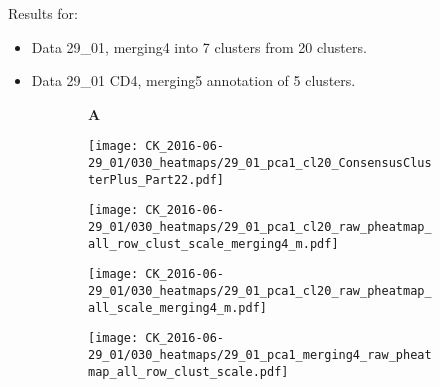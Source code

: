 \documentclass[a4paper, 12pt]{article}
\begin{document}
\pagestyle{empty}

Results for:
\begin{itemize}
  \item Data 29\_01, merging4 into 7 clusters from 20 clusters. 
  \item Data 29\_01 CD4, merging5 annotation of 5 clusters.
\end{itemize}

\begin{figure}[!thb]
\centering

    \caption{Data 29\_01, merging4 - 7 clusters}
    \begin{subfigure}[t]{0.02\textwidth}
    \vskip 0pt
        \textbf{\textsf{\normalsize A}}
    \end{subfigure}
    \begin{subfigure}[t]{0.45\textwidth}
    \vskip 0pt
    \caption{}
        \texttt{[image: CK\_2016-06-29\_01/030\_heatmaps/29\_01\_pca1\_cl20\_ConsensusClusterPlus\_Part22.pdf]}
    \end{subfigure}
    
\end{figure}


\begin{figure}[!thb]
\centering

    \caption{}
    \begin{subfigure}[t]{0.02\textwidth}
    \vskip 0pt
        \textbf{\textsf{\normalsize }}
    \end{subfigure}
    \begin{subfigure}[t]{0.9\textwidth}
    \vskip 0pt
    \caption{}
        \texttt{[image: CK\_2016-06-29\_01/030\_heatmaps/29\_01\_pca1\_cl20\_raw\_pheatmap\_all\_row\_clust\_scale\_merging4\_m.pdf]}
    \end{subfigure}
    
    \caption{}
    \begin{subfigure}[t]{0.02\textwidth}
    \vskip 0pt
        \textbf{\textsf{\normalsize }}
    \end{subfigure}
    \begin{subfigure}[t]{0.9\textwidth}
    \vskip 0pt
    \caption{}
        \texttt{[image: CK\_2016-06-29\_01/030\_heatmaps/29\_01\_pca1\_cl20\_raw\_pheatmap\_all\_scale\_merging4\_m.pdf]}
    \end{subfigure}
    
    \caption{}
    \begin{subfigure}[t]{0.02\textwidth}
    \vskip 0pt
        \textbf{\textsf{\normalsize }}
    \end{subfigure}
    \begin{subfigure}[t]{0.9\textwidth}
    \vskip 0pt
    \caption{}
        \texttt{[image: CK\_2016-06-29\_01/030\_heatmaps/29\_01\_pca1\_merging4\_raw\_pheatmap\_all\_row\_clust\_scale.pdf]}
    \end{subfigure}

\end{figure}
\end{document}
